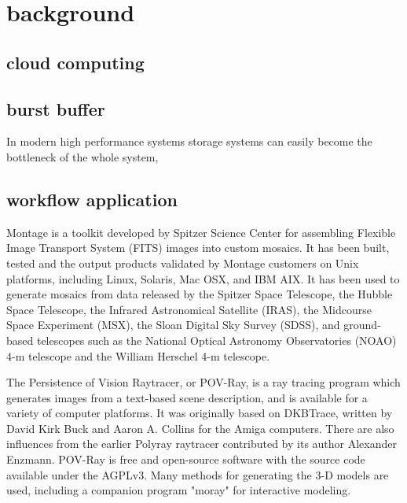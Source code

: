 \section{background}
\label{sec:background}
\subsection{cloud computing}

\subsection{burst buffer}
In modern high performance systems storage systems can easily become the bottleneck of the whole system, 
\subsection{workflow application}
Montage is a toolkit developed by Spitzer Science Center for assembling Flexible Image Transport System (FITS) images into custom mosaics.
It has been built, tested and the output products validated by Montage customers on Unix platforms, including Linux, Solaris, Mac OSX, and IBM AIX.
It has been used to generate mosaics from data released by the Spitzer Space Telescope, the Hubble Space Telescope, the Infrared Astronomical Satellite (IRAS),
the Midcourse Space Experiment (MSX), the Sloan Digital Sky Survey (SDSS), and ground-based telescopes such as the National Optical Astronomy Observatories (NOAO) 4-m telescope and the William Herschel 4-m telescope.

The Persistence of Vision Raytracer, or POV-Ray, is a ray tracing program which generates images from a text-based scene description,
and is available for a variety of computer platforms. It was originally based on DKBTrace, written by David Kirk Buck and Aaron A.
Collins for the Amiga computers.
There are also influences from the earlier Polyray raytracer contributed by its author Alexander Enzmann.
POV-Ray is free and open-source software with the source code available under the AGPLv3.
Many methods for generating the 3-D models are used, including a companion program "moray" for interactive modeling.

